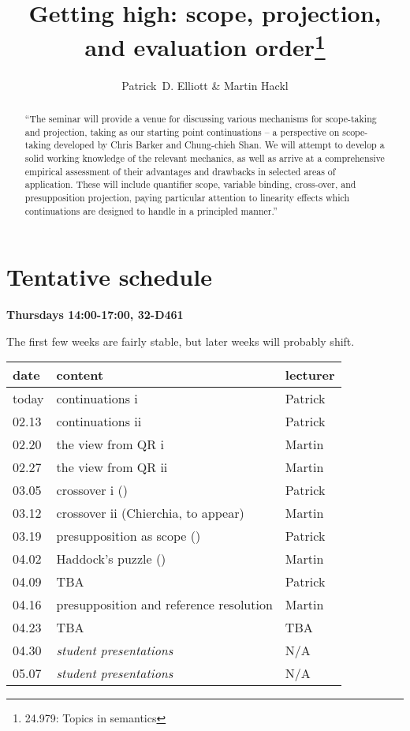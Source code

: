 \documentclass[nols,twoside,nofonts,nobib,nohyper]{tufte-handout}
\title{Getting high: scope, projection, and evaluation order\thanks{24.979: Topics in
    semantics}}
\author[Patrick D. Elliott and Martin Hackl]{Patrick~D. Elliott\sidenote{\texttt{pdell@mit.edu}} \& Martin Hackl\sidenote{\texttt{hackl@mit.edu}}}
\begin{document}
\maketitle%

\begin{abstract}
\enquote{The seminar will provide a venue for discussing various mechanisms for scope-taking and projection, taking as our starting point continuations -- a perspective on scope-taking developed by Chris Barker and Chung-chieh Shan. We will attempt to develop a solid working knowledge of the relevant mechanics, as well as arrive at a comprehensive empirical assessment of their advantages and drawbacks in selected areas of application. These will include quantifier scope, variable binding, cross-over, and presupposition projection, paying particular attention to linearity effects which continuations are designed to handle in a principled manner.}
\end{abstract}

\section{Tentative schedule}


\textbf{Thursdays 14:00-17:00, 32-D461}

The first few weeks are fairly stable, but later weeks will probably
shift.

\begin{table}[!ht]
\begin{tabular}{@{}lll@{}}
\toprule
  date & content  & lecturer  \\ \midrule
  today & continuations i &  Patrick \\
  02.13 & continuations ii & Patrick  \\
  02.20 & the view from QR i & Martin  \\
  02.27 & the view from QR ii & Martin  \\
  03.05 & crossover i (\citealt{shanBarker2006}) & Patrick \\
  03.12 & crossover ii (Chierchia, to appear) &  Martin \\
  03.19 & presupposition as scope (\citealt{grove2019}) & Patrick \\
  04.02 & Haddock's puzzle (\citealt{bumford2017}) & Martin \\
  04.09 & TBA & Patrick  \\
  04.16 & presupposition and reference resolution & Martin  \\
  04.23 & TBA & TBA \\
  04.30 & \textit{student presentations} & N/A  \\
  05.07 & \textit{student presentations} & N/A \\
 \bottomrule
\end{tabular}
\end{table}
\end{document}
